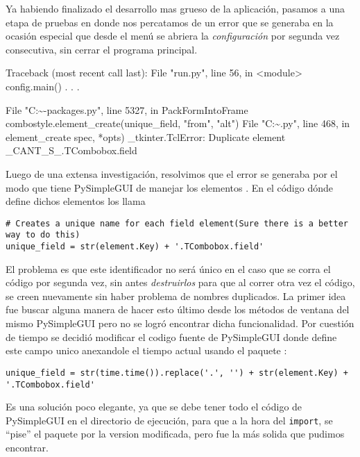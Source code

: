 
Ya habiendo finalizado el desarrollo mas grueso de la aplicación, pasamos a una etapa de pruebas en donde nos percatamos de un error que se generaba en la ocasión especial que desde el menú se abriera la \emph{configuración} por segunda vez consecutiva, sin cerrar el programa principal.
\begin{cverbatim}
Traceback (most recent call last):
  File "run.py", line 56, in <module>
    config.main()
        .
        .
        .
        
  File "C:\~\lib\site-packages\PPySimpleGUI\PySimpleGUI.py",
line 5327, in PackFormIntoFrame
    combostyle.element_create(unique_field, "from", "alt")
  File "C:\~\lib\tkinter\ttk.py", line 468, in element_create
    spec, *opts)
_tkinter.TclError: Duplicate element _CANT_S_.TCombobox.field
\end{cverbatim}

Luego de una extensa investigación, resolvimos que el error se generaba por el modo que tiene PySimpleGUI de manejar los elementos . En el código dónde define dichos elementos los llama   
\begin{verbatim}
# Creates a unique name for each field element(Sure there is a better way to do this)
unique_field = str(element.Key) + '.TCombobox.field'
\end{verbatim}
El problema es que este identificador no será único en el caso que se corra el código por segunda vez, sin antes \emph{destruirlos} para que al correr otra vez el código, se creen nuevamente sin haber problema de nombres duplicados.
La primer idea fue buscar alguna manera de hacer esto último desde los métodos de ventana del mismo PySimpleGUI pero no se logró encontrar dicha funcionalidad. Por cuestión de tiempo se decidió modificar el codigo fuente de PySimpleGUI donde define este campo unico anexandole el tiempo actual usando el paquete :
\begin{verbatim}
unique_field = str(time.time()).replace('.', '') + str(element.Key) + '.TCombobox.field'
\end{verbatim}
Es una solución poco elegante, ya que se debe tener todo el código de PySimpleGUI en el directorio de ejecución, para que a la hora del \texttt{import}, se ``pise'' el paquete por la version modificada, pero fue la más solida que pudimos encontrar. 